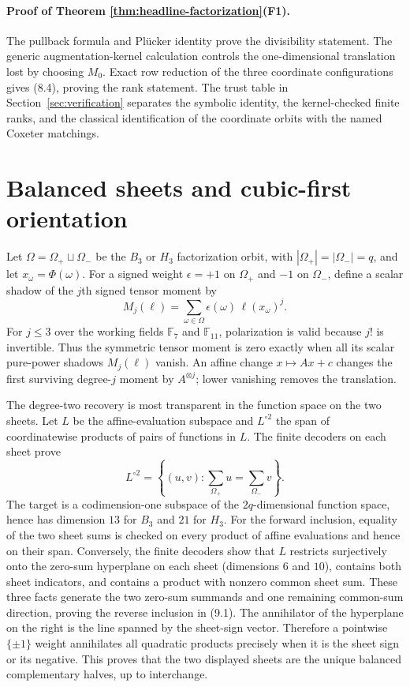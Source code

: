 \documentclass[11pt]{article}
\theoremstyle{definition}
\theoremstyle{remark}
\newcommand{\F}{\mathbb{F}}
\begin{document}
\paragraph{Proof of Theorem \ref{thm:headline-factorization}(F1).}
The pullback formula and Pl\"ucker identity prove the divisibility statement.  The generic
augmentation-kernel calculation controls the one-dimensional translation
lost by choosing $M_0$.  Exact row reduction of the three coordinate
configurations gives (8.4), proving the rank statement.  The trust table in
Section~\ref{sec:verification} separates the symbolic identity, the
kernel-checked finite ranks, and the classical identification of the
coordinate orbits with the named Coxeter matchings.

\section{Balanced sheets and cubic-first orientation}
\label{sec:balanced}

Let $\Omega=\Omega_+\sqcup\Omega_-$ be the $B_3$ or $H_3$
factorization orbit, with $|\Omega_+|=|\Omega_-|=q$, and let
$x_\omega=\Phi(\omega)$.  For a signed weight
$\epsilon=+1$ on $\Omega_+$ and $-1$ on $\Omega_-$, define a scalar shadow
of the $j$th signed tensor moment by
\[
 M_j(\ell)=\sum_{\omega\in\Omega}
   \epsilon(\omega)\,\ell(x_\omega)^j .
\]
For $j\le3$ over the working fields $\F_7$ and $\F_{11}$, polarization is
valid because $j!$ is invertible.  Thus the symmetric tensor moment is
zero exactly when all its scalar pure-power shadows $M_j(\ell)$ vanish.
An affine change $x\mapsto Ax+c$ changes the first surviving degree-$j$
moment by $A^{\otimes j}$; lower vanishing removes the translation.

The degree-two recovery is most transparent in the function space on the
two sheets.  Let $L$ be the affine-evaluation subspace and $L^{\circ2}$ the
span of coordinatewise products of pairs of functions in $L$.  The finite
decoders on each sheet prove
\[
 L^{\circ2}=
 \left\{(u,v):\sum_{\Omega_+}u=\sum_{\Omega_-}v\right\}. \tag{9.1}
\]
The target is a codimension-one subspace of the $2q$-dimensional function
space, hence has dimension $13$ for $B_3$ and $21$ for $H_3$.  For the
forward inclusion, equality of the two sheet sums is checked on every
product of affine evaluations and hence on their span.  Conversely, the
finite decoders show that $L$ restricts surjectively onto the zero-sum
hyperplane on each sheet (dimensions $6$ and $10$), contains both sheet
indicators, and contains a product with nonzero common sheet sum.  These
three facts generate the two zero-sum summands and one remaining common-sum
direction, proving the reverse inclusion in (9.1).
The annihilator of the hyperplane on the right is the line spanned by the
sheet-sign vector.  Therefore a pointwise $\{\pm1\}$ weight annihilates all
quadratic products precisely when it is the sheet sign or its negative.
This proves that the two displayed sheets are the unique balanced
complementary halves, up to interchange.
\end{document}
